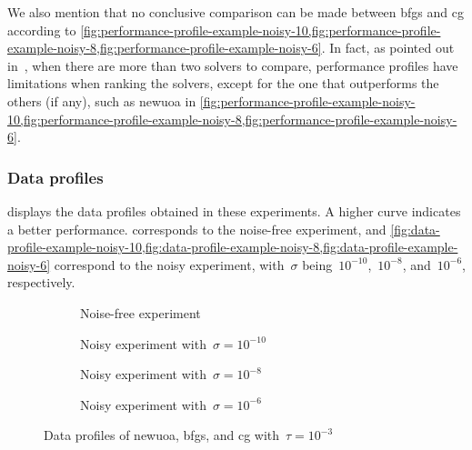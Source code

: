 We also mention that no conclusive comparison can be made between \gls{bfgs} and \gls{cg} according to \cref{fig:performance-profile-example-noisy-10,fig:performance-profile-example-noisy-8,fig:performance-profile-example-noisy-6}.
In fact, as pointed out in~\cite{Gould_Scott_2016}, when there are more than two solvers to compare, performance profiles have limitations when ranking the solvers, except for the one that outperforms the others (if any), such as \gls{newuoa} in \cref{fig:performance-profile-example-noisy-10,fig:performance-profile-example-noisy-8,fig:performance-profile-example-noisy-6}.

\subsubsection{Data profiles}

 displays the data profiles obtained in these experiments.
A higher curve indicates a better performance.
 corresponds to the noise-free experiment, and \cref{fig:data-profile-example-noisy-10,fig:data-profile-example-noisy-8,fig:data-profile-example-noisy-6} correspond to the noisy experiment, with~$\sigma$ being~$10^{-10}$,~$10^{-8}$, and~$10^{-6}$, respectively.

\begin{figure}[ht]
    \centering
    \begin{subfigure}[b]{0.49\textwidth}
        \centering
        \caption{Noise-free experiment}
        \label{fig:data-profile-example-noiseless}
    \end{subfigure}
    \hfill
    \begin{subfigure}[b]{0.49\textwidth}
        \centering
        \caption{Noisy experiment with~$\sigma = 10^{-10}$}
        \label{fig:data-profile-example-noisy-10}
    \end{subfigure}
    \par\bigskip
    \begin{subfigure}[b]{0.49\textwidth}
        \centering
        \caption{Noisy experiment with~$\sigma = 10^{-8}$}
        \label{fig:data-profile-example-noisy-8}
    \end{subfigure}
    \hfill
    \begin{subfigure}[b]{0.49\textwidth}
        \centering
        \caption{Noisy experiment with~$\sigma = 10^{-6}$}
        \label{fig:data-profile-example-noisy-6}
    \end{subfigure}
    \caption{Data profiles of \gls{newuoa}, \gls{bfgs}, and \gls{cg} with~$\tau = 10^{-3}$}
    \label{fig:data-profile-example}
\end{figure}

